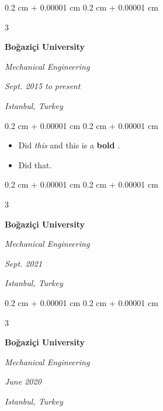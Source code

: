 \documentclass[10pt, letterpaper]{article}
\newenvironment{highlights}{
    \begin{itemize}[
        topsep=0.10 cm,
        parsep=0.10 cm,
        partopsep=0pt,
        itemsep=0pt,
        leftmargin=0.4 cm + 10pt + 0.6 cm
    ]
}{
    \end{itemize}
} %
\newenvironment{onecolentry}{
    \begin{adjustwidth}{
        0.2 cm + 0.00001 cm
    }{
        0.2 cm + 0.00001 cm
    }
}{
    \end{adjustwidth}
} %
\newenvironment{threecolentry}[3][]{
    \onecolentry
    \def\thirdColumn{#3}
    \setcolumnwidth{0.6 cm, \fill, 4.5 cm}
    \begin{paracol}{3}
    #2 \switchcolumn
}{
    \switchcolumn \raggedleft \thirdColumn
    \end{paracol}
    \endonecolentry
} %
\let\hrefWithoutArrow\href
\renewcommand{\href}[2]{\hrefWithoutArrow{#1}{\mbox{\ifthenelse{\equal{#2}{}}{ }{#2 }\raisebox{.15ex}{\footnotesize \faExternalLink*}}}}
\begin{document}
        \vspace{0.2 cm}

        \begin{threecolentry}{
            \vspace*{\fill}
            \textbullet
            \vspace*{3px}
            \vspace*{\fill}
        }{
        \textit{Sept. 2015 to present}
            
        \textit{Istanbul, Turkey}}
            \textbf{Boğaziçi University}

            \textit{Mechanical Engineering}
        \end{threecolentry}

        \vspace{0.10 cm}
        \begin{onecolentry}
            \begin{highlights}
                \item Did \textit{this} and this is a \textbf{bold} \href{https://example.com}{link}.
                \item Did that.
            \end{highlights}
        \end{onecolentry}


        \vspace{0.2 cm}

        \begin{threecolentry}{
            \vspace*{\fill}
            \textbullet
            \vspace*{3px}
            \vspace*{\fill}
        }{
        \textit{Sept. 2021}
            
        \textit{Istanbul, Turkey}}
            \textbf{Boğaziçi University}

            \textit{Mechanical Engineering}
        \end{threecolentry}



        \vspace{0.2 cm}

        \begin{threecolentry}{
            \vspace*{\fill}
            \textbullet
            \vspace*{3px}
            \vspace*{\fill}
        }{
        \textit{June 2020}
            
        \textit{Istanbul, Turkey}}
            \textbf{Boğaziçi University}

            \textit{Mechanical Engineering}
        \end{threecolentry}
\end{document}
